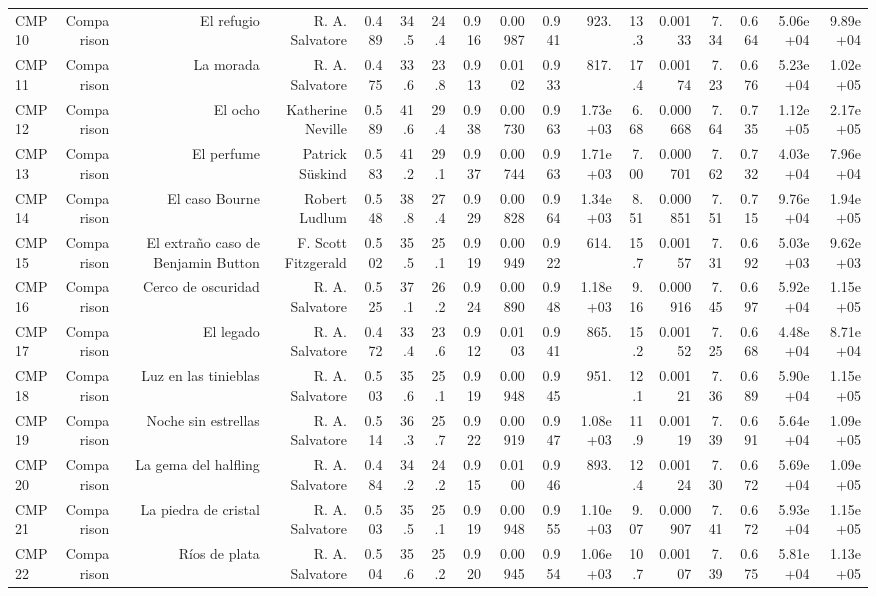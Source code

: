 \begin{table}[htbp]
\begin{tabular}{lrrrrrrrrrrrrrrrr}
CMP10 & Comparison & El refugio & R. A. Salvatore & 0.489 & 34.5 & 24.4 & 0.916 & 0.00987 & 0.941 & 923. & 13.3 & 0.00133 & 7.34 & 0.664 & 5.06e+04 & 9.89e+04 \\
CMP11 & Comparison & La morada & R. A. Salvatore & 0.475 & 33.6 & 23.8 & 0.913 & 0.0102 & 0.933 & 817. & 17.4 & 0.00174 & 7.23 & 0.676 & 5.23e+04 & 1.02e+05 \\
CMP12 & Comparison & El ocho & Katherine Neville & 0.589 & 41.6 & 29.4 & 0.938 & 0.00730 & 0.963 & 1.73e+03 & 6.68 & 0.000668 & 7.64 & 0.735 & 1.12e+05 & 2.17e+05 \\
CMP13 & Comparison & El perfume & Patrick Süskind & 0.583 & 41.2 & 29.1 & 0.937 & 0.00744 & 0.963 & 1.71e+03 & 7.00 & 0.000701 & 7.62 & 0.732 & 4.03e+04 & 7.96e+04 \\
CMP14 & Comparison & El caso Bourne & Robert Ludlum & 0.548 & 38.8 & 27.4 & 0.929 & 0.00828 & 0.964 & 1.34e+03 & 8.51 & 0.000851 & 7.51 & 0.715 & 9.76e+04 & 1.94e+05 \\
CMP15 & Comparison & El extraño caso de Benjamin Button & F. Scott Fitzgerald & 0.502 & 35.5 & 25.1 & 0.919 & 0.00949 & 0.922 & 614. & 15.7 & 0.00157 & 7.31 & 0.692 & 5.03e+03 & 9.62e+03 \\
CMP16 & Comparison & Cerco de oscuridad & R. A. Salvatore & 0.525 & 37.1 & 26.2 & 0.924 & 0.00890 & 0.948 & 1.18e+03 & 9.16 & 0.000916 & 7.45 & 0.697 & 5.92e+04 & 1.15e+05 \\
CMP17 & Comparison & El legado & R. A. Salvatore & 0.472 & 33.4 & 23.6 & 0.912 & 0.0103 & 0.941 & 865. & 15.2 & 0.00152 & 7.25 & 0.668 & 4.48e+04 & 8.71e+04 \\
CMP18 & Comparison & Luz en las tinieblas & R. A. Salvatore & 0.503 & 35.6 & 25.1 & 0.919 & 0.00948 & 0.945 & 951. & 12.1 & 0.00121 & 7.36 & 0.689 & 5.90e+04 & 1.15e+05 \\
CMP19 & Comparison & Noche sin estrellas & R. A. Salvatore & 0.514 & 36.3 & 25.7 & 0.922 & 0.00919 & 0.947 & 1.08e+03 & 11.9 & 0.00119 & 7.39 & 0.691 & 5.64e+04 & 1.09e+05 \\
CMP20 & Comparison & La gema del halfling & R. A. Salvatore & 0.484 & 34.2 & 24.2 & 0.915 & 0.0100 & 0.946 & 893. & 12.4 & 0.00124 & 7.30 & 0.672 & 5.69e+04 & 1.09e+05 \\
CMP21 & Comparison & La piedra de cristal & R. A. Salvatore & 0.503 & 35.5 & 25.1 & 0.919 & 0.00948 & 0.955 & 1.10e+03 & 9.07 & 0.000907 & 7.41 & 0.672 & 5.93e+04 & 1.15e+05 \\
CMP22 & Comparison & Ríos de plata & R. A. Salvatore & 0.504 & 35.6 & 25.2 & 0.920 & 0.00945 & 0.954 & 1.06e+03 & 10.7 & 0.00107 & 7.39 & 0.675 & 5.81e+04 & 1.13e+05 \\

\end{tabular}
\end{table}
